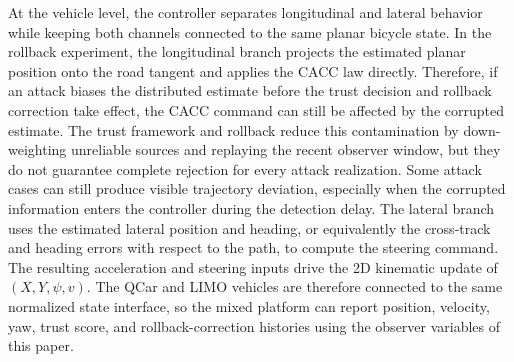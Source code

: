\documentclass[journal,twoside]{IEEEtran}
\begin{document}
At the vehicle level, the controller separates longitudinal and lateral behavior while keeping both channels connected to the same planar bicycle state. In the rollback experiment, the longitudinal branch projects the estimated planar position onto the road tangent and applies the CACC law directly. Therefore, if an attack biases the distributed estimate before the trust decision and rollback correction take effect, the CACC command can still be affected by the corrupted estimate. The trust framework and rollback reduce this contamination by down-weighting unreliable sources and replaying the recent observer window, but they do not guarantee complete rejection for every attack realization. Some attack cases can still produce visible trajectory deviation, especially when the corrupted information enters the controller during the detection delay. The lateral branch uses the estimated lateral position and heading, or equivalently the cross-track and heading errors with respect to the path, to compute the steering command. The resulting acceleration and steering inputs drive the 2D kinematic update of $(X,Y,\psi,v)$. The QCar and LIMO vehicles are therefore connected to the same normalized state interface, so the mixed platform can report position, velocity, yaw, trust score, and rollback-correction histories using the observer variables of this paper.
\end{document}
